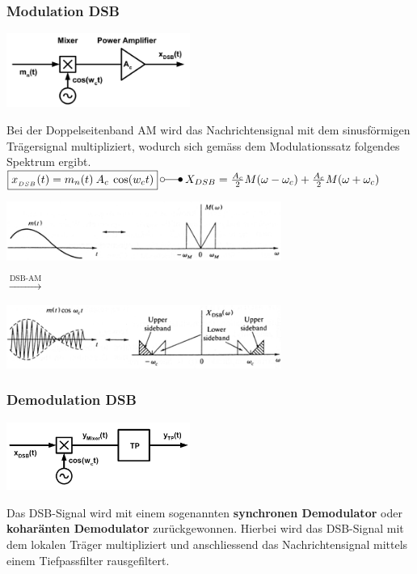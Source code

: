 \subsubsection{Modulation DSB}
\begin{minipage}[c][2.7cm][t]{6.5cm}
    \includegraphics[width=6cm]{bilder/am_dsb_modulation.png}
\end{minipage}
\begin{minipage}[c][2.7cm][t]{11.5cm}
Bei der Doppelseitenband AM wird das Nachrichtensignal mit dem sinusförmigen Trägersignal
multipliziert, wodurch sich gemäss dem Modulationssatz folgendes Spektrum ergibt. \\
	$ \boxed{x_{_{DSB}}(t) = m_n(t) \: A_c \: \cos(w_c t)} \: \laplace 
	\: X_{DSB} = \frac{A_c}{2}M(\omega - \omega_c) + \frac{A_c}{2}M(\omega + \omega_c)$
\end{minipage}

\begin{minipage}[c]{9cm}
    \includegraphics[width=9cm]{bilder/am_dsb_nachrichtensignal.png}
\end{minipage}
$\xrightarrow{\text{DSB-AM}}$
\begin{minipage}[c]{9cm}
    \includegraphics[width=9cm]{bilder/am_dsb_spektrum.png}
\end{minipage}

\subsubsection{Demodulation DSB} 
\label{am_dsb_demodulation}
\begin{minipage}[t][2.3cm][c]{6.5cm}
    \includegraphics[width=6cm]{bilder/am_dsb_demodulation}
\end{minipage}
\begin{minipage}[t][2.3cm][c]{11.5cm}
	Das DSB-Signal wird mit einem sogenannten \textbf{synchronen Demodulator} oder \textbf{koharänten
	Demodulator} zurückgewonnen. Hierbei wird das DSB-Signal mit dem lokalen Träger
	multipliziert und anschliessend das Nachrichtensignal mittels einem Tiefpassfilter rausgefiltert.
	\\ 
\end{minipage} \\


